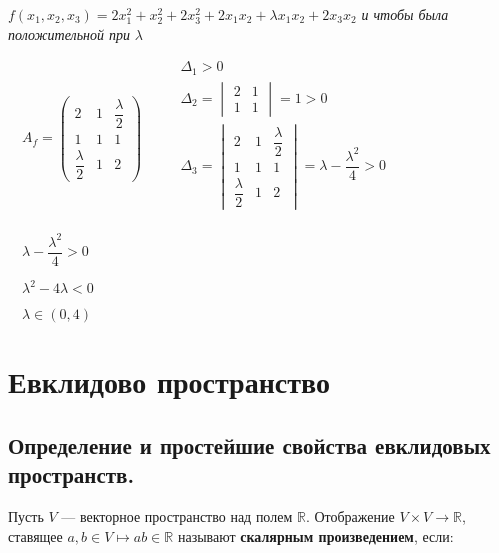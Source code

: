 \documentclass[a4paper, 12pt]{report}
\begin{document}
	$f(x_1,x_2,x_3)=2 x_1^2+x_2^2+2 x_3^2+ 2 x_1 x_2 + \lambda x_1 x_2 + 2 x_3 x_2$\textit{ и чтобы была положительной при }$\lambda$\\
	\par \bigskip
	$\quad A_f = \begin{pmatrix}
		2&1&\dfrac{\lambda}2\\
		1&1&1\\
		\dfrac{\lambda}2&1&2
	\end{pmatrix}$
	$\quad \quad  \begin{matrix}
		\Delta_1>0 \\
		\Delta_2=\begin{vmatrix} 2 & 1 \\ 1 & 1 \end{vmatrix} =1 >0 \\
		\Delta_3 =\begin{vmatrix} 2&1&\dfrac{\lambda}2\\
			1&1&1\\
			\dfrac{\lambda}2&1&2 \end{vmatrix} =\lambda - \dfrac{\lambda^2}4 >0\\
	\end{matrix}$
	
	$\quad \lambda -\dfrac{\lambda^2}4 >0$
	
	$\quad \lambda^2-4 \lambda < 0$
	
	$\quad \lambda \in (0,4)$
	
	
	
	
	
	
	
	
	
	
	
	
	
	\chapter{Евклидово пространство}
	
	
	
	
	
	
	\section{Определение и простейшие свойства евклидовых пространств.}
	\par \bigskip
	\quad\; Пусть $V$ --- векторное пространство над полем $\mathbb{R}$. Отображение $V \times V \rightarrow \mathbb{R}$, ставящее 
	$a,b \in V \mapsto ab \in \mathbb{R}$ называют \textbf{скалярным произведением}, если:
	
\end{document}
